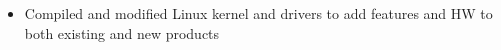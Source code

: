 \documentclass[letterpaper,11pt]{article}
\makeatletter
\newcommand{\resitem}[1]{\item #1 \vspace{-2pt}}
\newcommand{\ressubheading}[4]{
    \begin{tabular*}{6.5in}{l@{\extracolsep{\fill}}r}
      \textbf{#1} & #2 \\
      \textit{#3} & \textit{#4} \\
  \end{tabular*}\vspace{-6pt}}
\makeatother
\begin{document}
\begin{itemize}
{\begin{itemize}
	    \resitem{Compiled and modified Linux kernel and drivers to add features and HW to both existing and new products}
	\end{itemize}
      }
      \begin{comment}
      \item
	\ressubheading{\href{http://www.byui.edu}{Brigham Young University - Idaho}}{Rexburg, ID}{Student Computer Lab Administrator - Lead Tech}{May 2008 -- Apr. 2009}
	{ \footnotesize
	  \begin{itemize}
	      \resitem{Trained, coordinated, and guided a small team of students towards the completion of tasks involving all computer labs on campus}
	      \resitem{Administrated 62 labs, 1,300+ computers, and 17 PXE Servers in a two domain environment;  Utilized \href{http://www.symantec.com/business/deployment-solution}{Altiris Deployment Console} and scripting;  Specialized in \href{http://www.redhat.com/rhel/}{RHE Linux} deployments}
	      \resitem{Wrote concise installation and deployment instruction manuals and \href{http://www.derekhildreth.com/portfolio/Documentation/Lab_Binder_Documentation_BYUI_Work.pdf}{documentation} for computer labs and 200+ software titles}
	  \end{itemize}
	}
      \item 
	\ressubheading{Catch 80 Sports}{Rexburg, ID}{Network and Website Administrator}{Nov. 2006 -- Jun. 2007}
	{ \footnotesize
	  \begin{itemize}
	      \resitem{Implemented Windows based server with Linux based POS clients, reducing total cost of ownership}
	      \resitem{Contributed essentially to the company in the production of an e-commerce website with company inventory}
	      \resitem{Learned production of an entire e-commerce store in 1.5 months time with more than 2,800 products}
	  \end{itemize}
	}
      \end{comment}

  \end{itemize}  %
\end{document}
